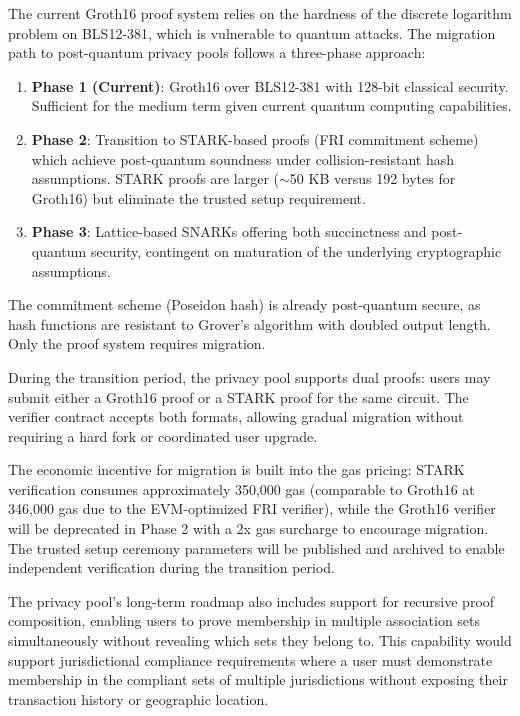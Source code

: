 \documentclass[11pt,a4paper]{article}
\begin{document}
The current Groth16 proof system relies on the hardness of the discrete logarithm problem on BLS12-381, which is vulnerable to quantum attacks. The migration path to post-quantum privacy pools follows a three-phase approach:

\begin{enumerate}
    \item \textbf{Phase 1 (Current)}: Groth16 over BLS12-381 with 128-bit classical security. Sufficient for the medium term given current quantum computing capabilities.
    \item \textbf{Phase 2}: Transition to STARK-based proofs (FRI commitment scheme) which achieve post-quantum soundness under collision-resistant hash assumptions. STARK proofs are larger ($\sim$50 KB versus 192 bytes for Groth16) but eliminate the trusted setup requirement.
    \item \textbf{Phase 3}: Lattice-based SNARKs offering both succinctness and post-quantum security, contingent on maturation of the underlying cryptographic assumptions.
\end{enumerate}

The commitment scheme (Poseidon hash) is already post-quantum secure, as hash functions are resistant to Grover's algorithm with doubled output length. Only the proof system requires migration.

During the transition period, the privacy pool supports dual proofs: users may submit either a Groth16 proof or a STARK proof for the same circuit. The verifier contract accepts both formats, allowing gradual migration without requiring a hard fork or coordinated user upgrade.

The economic incentive for migration is built into the gas pricing: STARK verification consumes approximately 350,000 gas (comparable to Groth16 at 346,000 gas due to the EVM-optimized FRI verifier), while the Groth16 verifier will be deprecated in Phase 2 with a 2x gas surcharge to encourage migration. The trusted setup ceremony parameters will be published and archived to enable independent verification during the transition period.

The privacy pool's long-term roadmap also includes support for recursive proof composition, enabling users to prove membership in multiple association sets simultaneously without revealing which sets they belong to. This capability would support jurisdictional compliance requirements where a user must demonstrate membership in the compliant sets of multiple jurisdictions without exposing their transaction history or geographic location.
\end{document}
